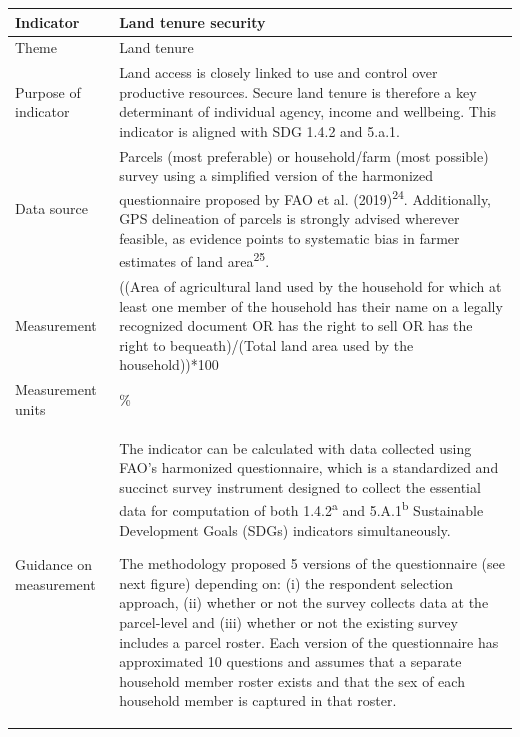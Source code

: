 \documentclass[
  letterpaper,
  DIV=11,
  numbers=noendperiod]{scrreprt}
\begin{document}
\begin{longtable}[]{@{}
  >{\raggedright\arraybackslash}p{}
  >{\raggedright\arraybackslash}p{}@{}}
\toprule\noalign{}
\begin{minipage}[b]{\linewidth}\raggedright
\textbf{Indicator}
\end{minipage} & \begin{minipage}[b]{\linewidth}\raggedright
\textbf{Land tenure security}
\end{minipage} \\
\midrule\noalign{}
\endhead
\bottomrule\noalign{}
\endlastfoot
Theme & Land tenure \\
Purpose of indicator & Land access is closely linked to use and control
over productive resources. Secure land tenure is therefore a key
determinant of individual agency, income and wellbeing. This indicator
is aligned with SDG 1.4.2 and 5.a.1. \\
Data source & Parcels (most preferable) or household/farm (most
possible) survey using a simplified version of the harmonized
questionnaire proposed by FAO et al. (2019)\textsuperscript{24}.
Additionally, GPS delineation of parcels is strongly advised wherever
feasible, as evidence points to systematic bias in farmer estimates of
land area\textsuperscript{25}. \\
Measurement & ((Area of agricultural land used by the household for
which at least one member of the household has their name on a legally
recognized document OR has the right to sell OR has the right to
bequeath)/(Total land area used by the household))*100 \\
Measurement units & \% \\
Guidance on measurement & \begin{minipage}[t]{\linewidth}\raggedright
The indicator can be calculated with data collected using FAO's
harmonized questionnaire, which is a standardized and succinct survey
instrument designed to collect the essential data for computation of
both 1.4.2\textsuperscript{a} and 5.A.1\textsuperscript{b} Sustainable
Development Goals (SDGs) indicators simultaneously.

The methodology proposed 5 versions of the questionnaire (see next
figure) depending on: (i) the respondent selection approach, (ii)
whether or not the survey collects data at the parcel-level and (iii)
whether or not the existing survey includes a parcel roster. Each
version of the questionnaire has approximated 10 questions and assumes
that a separate household member roster exists and that the sex of each
household member is captured in that roster.


\end{minipage}
\end{longtable}
\end{document}

